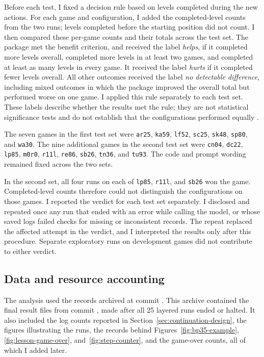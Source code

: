 Before each test, I fixed a decision rule based on levels completed during the new actions. For each game and configuration, I added the completed-level counts from the two runs; levels completed before the starting position did not count. I then compared these per-game counts and their totals across the test set. The package met the benefit criterion, and received the label \emph{helps}, if it completed more levels overall, completed more levels in at least two games, and completed at least as many levels in every game. It received the label \emph{hurts} if it completed fewer levels overall. All other outcomes received the label \emph{no detectable difference}, including mixed outcomes in which the package improved the overall total but performed worse on one game. I applied this rule separately to each test set. These labels describe whether the results met the rule; they are not statistical significance tests and do not establish that the configurations performed equally \citep{dai2026brieftests}.

The seven games in the first test set were \texttt{ar25}, \texttt{ka59}, \texttt{lf52}, \texttt{sc25}, \texttt{sk48}, \texttt{sp80}, and \texttt{wa30}. The nine additional games in the second test set were \texttt{cn04}, \texttt{dc22}, \texttt{lp85}, \texttt{m0r0}, \texttt{r11l}, \texttt{re86}, \texttt{sb26}, \texttt{tn36}, and \texttt{tu93}. The code and prompt wording remained fixed across the two sets.

In the second set, all four runs on each of \texttt{lp85}, \texttt{r11l}, and \texttt{sb26} won the game. Completed-level counts therefore could not distinguish the configurations on those games. I reported the verdict for each test set separately. I disclosed and repeated once any run that ended with an error while calling the model, or whose saved logs failed checks for missing or inconsistent records. The repeat replaced the affected attempt in the verdict, and I interpreted the results only after this procedure. Separate exploratory runs on development games did not contribute to either verdict.

\subsection{Data and resource accounting}\label{sec:analysis-method}
The analysis used the records archived at commit  \citep{dai2026harnessexport,dai2026finalmanifest}. This archive contained the final result files from commit , made after all 25 layered runs ended or halted. It also included the log counts reported in Section~\ref{sec:continuation-design}, the figures illustrating the runs, the records behind Figures~\ref{fig:bp35-example}, \ref{fig:lesson-game-over}, and~\ref{fig:step-counter}, and the game-over counts, all of which I added later.

